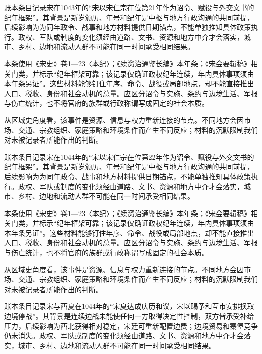 账本条目记录宋在1043年的“宋以宋仁宗在位第21年作为诏令、赋役与外交文书的纪年框架”。其背景是新岁颁历、年号和纪年是中枢与地方行政沟通的共同前提，后续影响为为同年政令、战事和地方材料提供日期锚点，不能单独推知具体政策执行。政权、军队或制度的变化须经由道路、文书、资源和地方中介才会落实，城市、乡村、边地和流动人群不可能在同一时间承受相同结果。

本条使用《宋史》卷1—23〈本纪〉；《续资治通鉴长编》本年条；《宋会要辑稿》相关门类，并标示“纪年框架可靠；该记录仅确证政权纪年连续，年内具体事项须由本年条另证”。这些材料能够钉住年序、命令、战役或局部地点，却不能直接推出人口、税收、身份和社会动机的总量。应区分诏令与实施、条约与边境生活、军报与伤亡统计，也不将官府的族群或行政称谓写成固定的社会本质。

从区域史角度看，该事件是资源、信息与权力重新连接的节点。不同地方会因市场、交通、宗教组织、家庭策略和环境条件而产生不同反应；材料的沉默限制我们对未被记录者所能作出的判断。

账本条目记录宋在1044年的“宋以宋仁宗在位第22年作为诏令、赋役与外交文书的纪年框架”。其背景是新岁颁历、年号和纪年是中枢与地方行政沟通的共同前提，后续影响为为同年政令、战事和地方材料提供日期锚点，不能单独推知具体政策执行。政权、军队或制度的变化须经由道路、文书、资源和地方中介才会落实，城市、乡村、边地和流动人群不可能在同一时间承受相同结果。

本条使用《宋史》卷1—23〈本纪〉；《续资治通鉴长编》本年条；《宋会要辑稿》相关门类，并标示“纪年框架可靠；该记录仅确证政权纪年连续，年内具体事项须由本年条另证”。这些材料能够钉住年序、命令、战役或局部地点，却不能直接推出人口、税收、身份和社会动机的总量。应区分诏令与实施、条约与边境生活、军报与伤亡统计，也不将官府的族群或行政称谓写成固定的社会本质。

从区域史角度看，该事件是资源、信息与权力重新连接的节点。不同地方会因市场、交通、宗教组织、家庭策略和环境条件而产生不同反应；材料的沉默限制我们对未被记录者所能作出的判断。

账本条目记录宋与西夏在1044年的“宋夏达成庆历和议，宋以赐予和互市安排换取边境停战”。其背景是连续边战未能使任何一方取得决定性控制，双方皆承受补给压力，后续影响为西北获得相对稳定，宋廷可重新配置边费；边境贸易和寨堡竞争仍未消失。政权、军队或制度的变化须经由道路、文书、资源和地方中介才会落实，城市、乡村、边地和流动人群不可能在同一时间承受相同结果。

